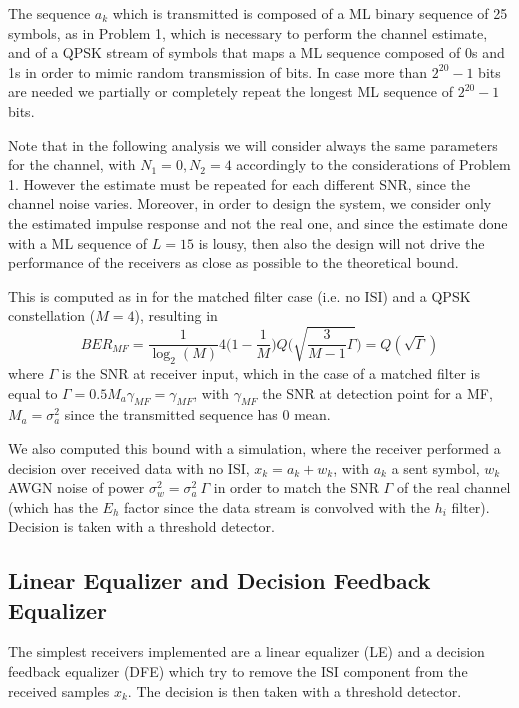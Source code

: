 \documentclass[10pt]{article}
\begin{document}
The sequence $a_k$ which is transmitted is composed of a ML binary sequence of 25 symbols, as in Problem 1, which is necessary to perform the channel estimate, and of a QPSK stream of symbols that maps a ML sequence composed of 0s and 1s in order to mimic random transmission of bits. In case more than $2^{20}-1$ bits are needed we partially or completely repeat the longest ML sequence of $2^{20}-1$ bits.

Note that in the following analysis we will consider always the same parameters for the channel, with $N_1 = 0, N_2 = 4$ accordingly to the considerations of Problem 1. However the estimate must be repeated for each different SNR, since the channel noise varies. Moreover, in order to design the system, we consider only the estimated impulse response and not the real one, and since the estimate done with a ML sequence of $L = 15$ is lousy, then also the design will not drive the performance of the receivers as close as possible to the theoretical bound. 

This is computed as in \cite{bc} for the matched filter case (i.e. no ISI) and a QPSK constellation ($M=4$), resulting in 
\begin{equation}
	BER_{MF} = \frac{1}{\log_2 (M)} 4 \bigg(1- \frac{1}{M} \bigg) Q\bigg(\sqrt{\frac{3}{M-1} \Gamma}\bigg) = Q(\sqrt{\Gamma})
	\label{eq:BERmf}
\end{equation}
where $\Gamma$ is the SNR at receiver input, which in the case of a matched filter is equal to $\Gamma = 0.5 M_a \gamma_{MF}= \gamma_{MF}$, with $\gamma_{MF}$ the SNR at detection point for a MF, $M_a = \sigma_a^2$ since the transmitted sequence has 0 mean.

We also computed this bound with a simulation, where the receiver performed a decision over received data with no ISI, $x_k = a_k + w_k$, with $a_k$ a sent symbol, $w_k$ AWGN noise of power $\sigma_w^2 = \sigma_a^2 \ \Gamma$ in order to match the SNR $\Gamma$ of the real channel (which has the $E_h$ factor since the data stream is convolved with the $h_i$ filter). Decision is taken with a threshold detector.

\subsection*{Linear Equalizer and Decision Feedback Equalizer}
The simplest receivers implemented are a linear equalizer (LE) and a decision feedback equalizer (DFE) which try to remove the ISI component from the received samples $x_k$. The decision is then taken with a threshold detector. 
\end{document}

